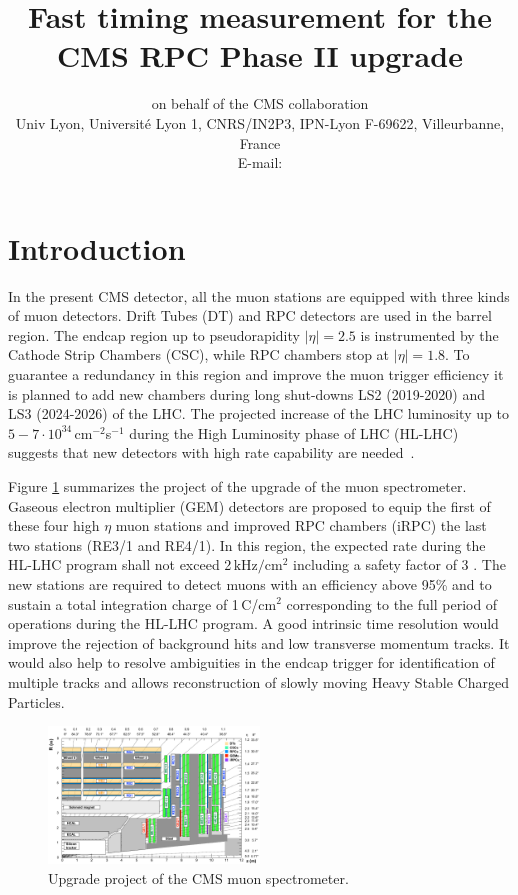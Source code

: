 \documentclass{PoS}
\title{Fast timing measurement for the CMS RPC Phase II upgrade}
\author{\speaker{Maxime Gouzevitch} on behalf of the CMS collaboration\\
        Univ Lyon, Universit\'e Lyon 1, CNRS/IN2P3, IPN-Lyon F-69622, Villeurbanne, France\\
        E-mail: \email{mgouzevi@ipnl.in2p3.fr}}
\newcommand{\khzcm}{\mathrm{kHz/cm^2}}
\begin{document}
\section*{Introduction}

In the present CMS detector, all the muon stations are equipped with three kinds of muon detectors. Drift Tubes (DT) and RPC detectors are used in the barrel region.  The endcap region up to pseudorapidity $|\eta| = 2.5$ is instrumented by the Cathode Strip Chambers (CSC), while RPC chambers stop at $|\eta| = 1.8$.
To guarantee a redundancy in this region and improve the muon trigger efficiency it is planned to add new chambers during long shut-downs LS2 (2019-2020) and LS3 (2024-2026) of the LHC. The projected increase of the LHC luminosity  up to $5-7 \cdot 10^{34}$\,cm$^{-2}$s$^{-1}$ during the High Luminosity phase of LHC (HL-LHC) suggests that new detectors with high rate capability are needed~\cite{upgrade}.

Figure \ref{fig.upgrade} summarizes the project of the upgrade of the muon spectrometer. 
Gaseous electron multiplier (GEM) detectors are proposed to equip the first of these four high $\eta$ muon stations and improved RPC chambers (iRPC) the last two stations (RE3/1 and RE4/1). In this region, the expected rate during the HL-LHC program shall not exceed 2\,$\khzcm$ including a safety factor of 3 \cite{upgrade}. The new stations are required to detect muons with an efficiency above 95\% and to sustain a total integration charge of 1\,C/cm$^2$ corresponding to the full period of operations during the HL-LHC program. A good intrinsic time resolution would improve the rejection of background hits and low transverse momentum tracks. It would also help to resolve ambiguities in the endcap trigger
for identification of multiple tracks and allows reconstruction of slowly moving Heavy Stable Charged Particles.

\begin{figure}
  \begin{center}
    \includegraphics[width=0.50\textwidth]{figs/rpclayout.png}
  \end{center}
 \caption{Upgrade project of the CMS muon spectrometer.} \label{fig.upgrade}
\end{figure}
\end{document}
